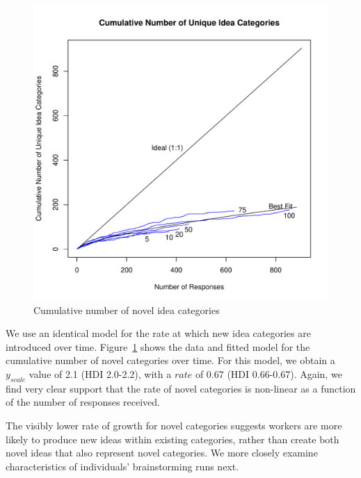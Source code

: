\begin{figure}[h!]
    \centering
    \includegraphics[width=0.9\columnwidth]{cumulative_categories}
    \caption{Cumulative number of novel idea categories}
    \label{fig:cumulative_categories}
\end{figure}


We use an identical model for the rate at which new idea categories are introduced over time. Figure~\ref{fig:cumulative_categories} shows the data and fitted model for the cumulative number of novel categories over time. For this model, we obtain a $y_{scale}$ value of 2.1 (HDI 2.0-2.2), with a $rate$ of 0.67 (HDI 0.66-0.67). Again, we find very clear support that the rate of novel categories is non-linear as a function of the number of responses received.

The visibly lower rate of growth for novel categories suggests workers are more likely to produce new ideas within existing categories, rather than create both novel ideas that also represent novel categories. We more closely examine characteristics of individuals' brainstorming runs next.


